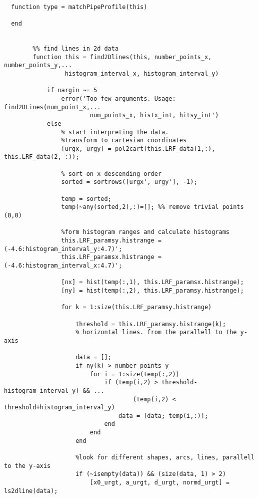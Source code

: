\begin{lstlisting}
  
  function type = matchPipeProfile(this)
            
  end
        
        
        %% find lines in 2d data
        function this = find2Dlines(this, number_points_x, number_points_y,...
                 histogram_interval_x, histogram_interval_y)
            
            if nargin ~= 5
                error('Too few arguments. Usage: find2DLines(num_point_x,...
                        num_points_x, histx_int, hitsy_int')
            else
                % start interpreting the data.
                %transform to cartesian coordinates
                [urgx, urgy] = pol2cart(this.LRF_data(1,:), this.LRF_data(2, :));
                
                % sort on x descending order
                sorted = sortrows([urgx', urgy'], -1);
                
                temp = sorted;
                temp(~any(sorted,2),:)=[]; %% remove trivial points (0,0)
                
                %form histogram ranges and calculate histograms
                this.LRF_paramsy.histrange = (-4.6:histogram_interval_y:4.7)';
                this.LRF_paramsx.histrange = (-4.6:histogram_interval_x:4.7)';
                
                [nx] = hist(temp(:,1), this.LRF_paramsx.histrange);
                [ny] = hist(temp(:,2), this.LRF_paramsy.histrange);
                
                for k = 1:size(this.LRF_paramsy.histrange)
                    
                    threshold = this.LRF_paramsy.histrange(k);
                    % horizontal lines. from the parallell to the y-axis
                    
                    data = [];
                    if ny(k) > number_points_y
                        for i = 1:size(temp(:,2))
                            if (temp(i,2) > threshold-histogram_interval_y) && ...
                                    (temp(i,2) < threshold+histogram_interval_y)
                                data = [data; temp(i,:)];
                            end
                        end
                    end
                    
                    %look for different shapes, arcs, lines, parallell to the y-axis
                    if (~isempty(data)) && (size(data, 1) > 2)
                        [x0_urgt, a_urgt, d_urgt, normd_urgt] = ls2dline(data);
                        

\end{lstlisting}
